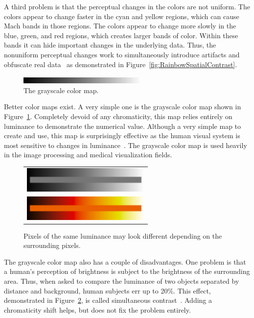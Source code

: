 \documentclass[twocolumn]{article}
\newcommand{\lcite}[1]{~\cite{#1}}
\begin{document}
A third problem is that the perceptual changes in the colors are not
uniform.  The colors appear to change faster in the cyan and yellow
regions, which can cause Mach bands in those regions.  The colors appear to
change more slowly in the blue, green, and red regions, which creates larger
bands of color.  Within these bands it can hide important changes in the
underlying data.  Thus, the nonuniform perceptual changes work to
simultaneously introduce artifacts and obfuscate real
data\lcite{Borland07} as demonstrated in
Figure~\ref{fig:RainbowSpatialContrast}.

\begin{figure}
  \centering
  \includegraphics[width=2.5in]{images/GrayscaleBar}
  \caption{The grayscale color map.}
  \label{fig:GrayscaleColorMap}
\end{figure}
Better color maps exist.  A very simple one is the grayscale
color map shown in Figure~\ref{fig:GrayscaleColorMap}.  Completely devoid
of any chromaticity, this map relies entirely on luminance to demonstrate
the numerical value.  Although a very simple map to create and use, this
map is surprisingly effective as the human visual system is most sensitive
to changes in luminance\lcite{Ware04,Mullen85}.  The grayscale color map is
used heavily in the image processing and medical visualization fields.

\begin{figure}
  \centering
  \begin{tabular}{c}
    \includegraphics[width=2.5in]{images/GrayscaleLocality} \\
    \includegraphics[width=2.5in]{images/BlackBodyLocality}
  \end{tabular}
  \caption{Pixels of the same luminance may look different depending on the
    surrounding pixels.}
  \label{fig:SimultaneousContrast}
\end{figure}
The grayscale color map also has a couple of disadvantages.  One problem is
that a human's perception of brightness is subject to the brightness of the
surrounding area.  Thus, when asked to compare the luminance of two objects
separated by distance and background, human subjects err up to 20\%.
This effect, demonstrated in Figure~\ref{fig:SimultaneousContrast}, is
called simultaneous contrast\lcite{Stone05}.  Adding a chromaticity shift
helps, but does not fix the problem entirely.
\end{document}
